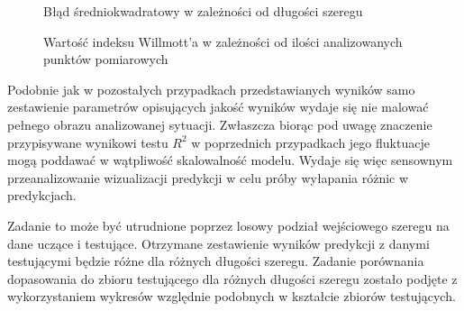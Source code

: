\documentclass[10pt,a4paper]{article}
\begin{document}
\begin{figure}[!ht]
\centering
{}
\caption{Błąd średniokwadratowy w zależności od długości szeregu}
\label{figure:scale_mse}
\end{figure}
\FloatBarrier

\begin{figure}[!ht]
	\centering
	\caption{Wartość indeksu Willmott'a w zależności od ilości analizowanych punktów pomiarowych}
	\label{figure:scale_willmott}
\end{figure}
\FloatBarrier

Podobnie jak w pozostałych przypadkach przedstawianych wyników samo zestawienie parametrów opisujących jakość wyników wydaje się nie malować pełnego obrazu analizowanej sytuacji. Zwłaszcza biorąc pod uwagę znaczenie przypisywane wynikowi testu $R^2$ w poprzednich przypadkach jego fluktuacje mogą poddawać w wątpliwość skalowalność modelu. Wydaje się więc sensownym przeanalizowanie wizualizacji predykcji w celu próby wyłapania różnic w predykcjach. 

Zadanie to może być utrudnione poprzez losowy podział wejściowego szeregu na dane uczące i testujące. Otrzymane zestawienie wyników predykcji z danymi testującymi będzie różne dla różnych długości szeregu. Zadanie porównania dopasowania do zbioru testującego dla różnych długości szeregu zostało podjęte z wykorzystaniem wykresów względnie podobnych w kształcie zbiorów testujących. 
\end{document}
